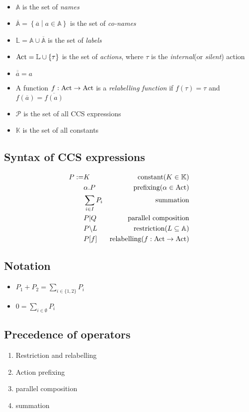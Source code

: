 \begin{definition}~
	\begin{itemize}
		\item $ \mathbb{A} $ is the set of \emph{names}
		\item $ \overline{\mathbb{A}} = \left\lbrace\overline{a}\middle\vert a\in\mathbb{A}\right\rbrace $ is the set of \emph{co-names}
		\item $ \mathbb{L}=\mathbb{A}\cup\overline{\mathbb{A}} $ is the set of \emph{labels}
		\item $ \textnormal{Act} = \mathbb{L}\cup\{\tau\} $ is the set of \emph{actions}, where $ \tau $ is the \emph{internal}(or \emph{silent}) action
		\item $ \overline{\overline{a}} = a $
		\item A function $ f:\textnormal{Act}\rightarrow\textnormal{Act} $ is a \emph{relabelling function} if $ f(\tau)=\tau $ and $ f(\overline{a}) = \overline{f(a)} $
		\item $ \mathcal{P} $ is the set of all CCS expressions
		\item $ \mathbb{K} $ is the set of all constants
	\end{itemize}
\end{definition}
\subsection*{Syntax of CCS expressions}
\begin{align*}
P:=&K&\text{constant} (K\in\mathbb{K})\\
&\alpha.P&\text{prefixing}(\alpha\in\textnormal{Act})\\
&\sum_{i\in I}P_i&\text{summation}\\
&P\vert Q&\text{parallel composition}\\
&P\backslash L&\text{restriction}(L\subseteq \mathbb{A})\\
&P[f]&\text{relabelling}(f:\textnormal{Act}\rightarrow\textnormal{Act})
\end{align*}
\subsection*{Notation}
\begin{itemize}
	\item $ P_1+P_2=\sum_{i\in\{1,2\}}P_i $
	\item $ 0 = \sum_{i\in\emptyset}P_i $
\end{itemize}
\subsection*{Precedence of operators}
\begin{enumerate}
	\item Restriction and relabelling
	\item Action prefixing
	\item parallel composition
	\item summation
\end{enumerate}
